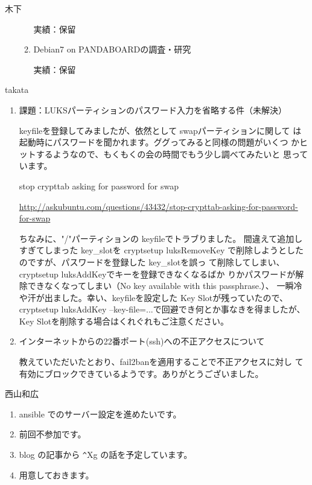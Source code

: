 \documentclass[mingoth,a4paper]{jsarticle}
\begin{document}
\begin{prework}{ 木下 }
\begin{enumerate}
\begin{enumerate}
      実績：保留
    \item Debian7 on PANDABOARDの調査・研究

      実績：保留
    \end{enumerate}
  \end{enumerate}
\end{prework}

\begin{prework}{ takata }
  \begin{enumerate}
  \item 課題：LUKSパーティションのパスワード入力を省略する件（未解決）

    keyfileを登録してみましたが、依然として swapパーティションに関して
    は起動時にパスワードを聞かれます。ググってみると同様の問題がいくつ
    かヒットするようなので、もくもくの会の時間でもう少し調べてみたいと
    思っています。

    stop crypttab asking for password for swap

    \url{http://askubuntu.com/questions/43432/stop-crypttab-asking-for-password-for-swap}

    ちなみに、"/"パーティションの keyfileでトラブりました。
    間違えて追加しすぎてしまった key\_{}slotを cryptsetup luksRemoveKey
    で削除しようとしたのですが、パスワードを登録した key\_{}slotを誤っ
    て削除してしまい、cryptsetup luksAddKeyでキーを登録できなくなるばか
    りかパスワードが解除できなくなってしまい（No key available with this passphrase.）、
    一瞬冷や汗が出ました。幸い、keyfileを設定した Key Slotが残っていたので、
    cryptsetup luksAddKey --key-file=...で回避でき何とか事なきを得ましたが、
    Key Slotを削除する場合はくれぐれもご注意ください。

  \item インターネットからの22番ポート(ssh)への不正アクセスについて

    教えていただいたとおり、fail2banを適用することで不正アクセスに対し
    て有効にブロックできているようです。ありがとうございました。
  \end{enumerate}
\end{prework}

\clearpage

\begin{prework}{ 西山和広 }
  \begin{enumerate}
  \item ansible でのサーバー設定を進めたいです。
  \item 前回不参加です。
  \item blog の記事から \verb+^+Xg の話を予定しています。
  \item 用意しておきます。
  \end{enumerate}
\end{prework}
\end{document}
